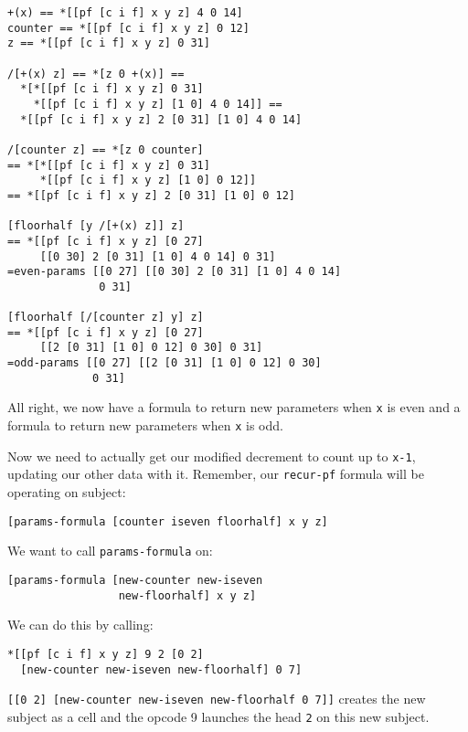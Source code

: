 \documentclass[twoside]{article}
\begin{document}
\begin{lstlisting}[style=listingblock]
+(x) == *[[pf [c i f] x y z] 4 0 14]
counter == *[[pf [c i f] x y z] 0 12]
z == *[[pf [c i f] x y z] 0 31]

/[+(x) z] == *[z 0 +(x)] ==
  *[*[[pf [c i f] x y z] 0 31]
    *[[pf [c i f] x y z] [1 0] 4 0 14]] ==
  *[[pf [c i f] x y z] 2 [0 31] [1 0] 4 0 14]

/[counter z] == *[z 0 counter]
== *[*[[pf [c i f] x y z] 0 31]
     *[[pf [c i f] x y z] [1 0] 0 12]]
== *[[pf [c i f] x y z] 2 [0 31] [1 0] 0 12]

[floorhalf [y /[+(x) z]] z]
== *[[pf [c i f] x y z] [0 27]
     [[0 30] 2 [0 31] [1 0] 4 0 14] 0 31]
=even-params [[0 27] [[0 30] 2 [0 31] [1 0] 4 0 14]
              0 31]

[floorhalf [/[counter z] y] z]
== *[[pf [c i f] x y z] [0 27]
     [[2 [0 31] [1 0] 0 12] 0 30] 0 31]
=odd-params [[0 27] [[2 [0 31] [1 0] 0 12] 0 30]
             0 31]
\end{lstlisting}

\noindent
All right, we now have a formula to return new parameters when \lstinline[style=inlinecode]{x} is even and a formula to return new parameters when \lstinline[style=inlinecode]{x} is odd.

Now we need to actually get our modified decrement to count up to \lstinline[style=inlinecode]{x-1}, updating our other data with it. Remember, our \lstinline[style=inlinecode]{recur-pf} formula will be operating on subject:  

\begin{lstlisting}[style=listingblock]
[params-formula [counter iseven floorhalf] x y z]
\end{lstlisting}

\noindent
We want to call \lstinline[style=inlinecode]{params-formula} on:

\begin{lstlisting}[style=listingblock]
[params-formula [new-counter new-iseven
                 new-floorhalf] x y z]
\end{lstlisting}

\noindent
We can do this by calling:

\begin{lstlisting}[style=listingblock]
*[[pf [c i f] x y z] 9 2 [0 2]
  [new-counter new-iseven new-floorhalf] 0 7]
\end{lstlisting}

\noindent
\lstinline[style=inlinecode]{[[0 2] [new-counter new-iseven new-floorhalf 0 7]]} creates the new subject as a cell and the opcode 9 launches the head \lstinline[style=inlinecode]{2} on this new subject.
\end{document}
